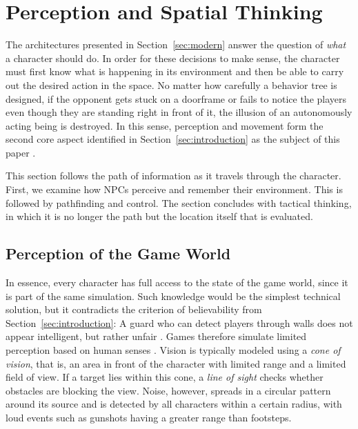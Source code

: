 \section{Perception and Spatial Thinking}
\label{sec:perception}

The architectures presented in Section~\ref{sec:modern} answer the question of \emph{what} a character should do. In order for these decisions to make sense, the character must first know what is happening in its environment and then be able to carry out the desired action in the space. No matter how carefully a behavior tree is designed, if the opponent gets stuck on a doorframe or fails to notice the players even though they are standing right in front of it, the illusion of an autonomously acting being is destroyed. In this sense, perception and movement form the second core aspect identified in Section~\ref{sec:introduction} as the subject of this paper \cite{millington2009}.

This section follows the path of information as it travels through the character. First, we examine how NPCs perceive and remember their environment. This is followed by pathfinding and control. The section concludes with tactical thinking, in which it is no longer the path but the location itself that is evaluated.

\subsection{Perception of the Game World}

In essence, every character has full access to the state of the game world, since it is part of the same simulation. Such knowledge would be the simplest technical solution, but it contradicts the criterion of believability from Section~\ref{sec:introduction}: A guard who can detect players through walls does not appear intelligent, but rather unfair \cite{yannakakis2018}. Games therefore simulate limited perception based on human senses \cite{millington2009}. Vision is typically modeled using a \emph{cone of vision}, that is, an area in front of the character with limited range and a limited field of view. If a target lies within this cone, a \emph{line of sight} checks whether obstacles are blocking the view. Noise, however, spreads in a circular pattern around its source and is detected by all characters within a certain radius, with loud events such as gunshots having a greater range than footsteps.


